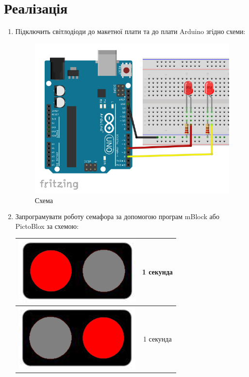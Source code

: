 \documentclass[oneside, final]{article}
\begin{document}
\section{Реалізація}
	\begin{enumerate}
		\item Підключить світлодіоди до макетної плати та до плати Arduino згідно схеми:
			\begin{figure}[!ht]
				\centering
				\includegraphics[scale=0.5]{circuit.png}
				\caption{Схема}
			\end{figure}
		\item Запрограмувати роботу семафора за допомогою програм mBlock або PictoBlox за схемою:
		
		\centering
		\begin{tabular}{|c|c|} \hline
			\includegraphics[scale=0.5]{signal01.png}
			& 1 секунда
			\\
			\hline
			\includegraphics[scale=0.5]{signal02.png} 
			& 1 секунда
			\\
			\hline
		\end{tabular}
	\end{enumerate}
	
\end{document}
